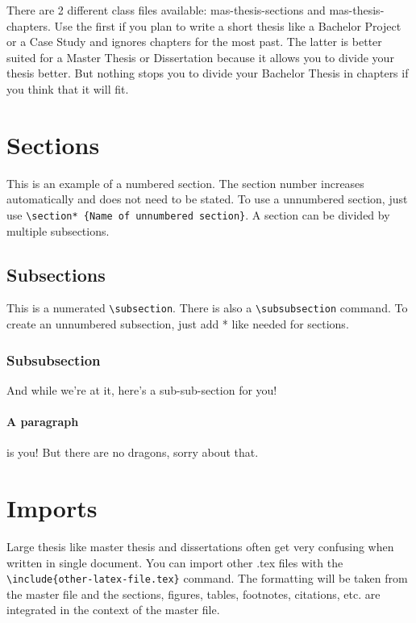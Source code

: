 \documentclass[masterarbeit,grey, english]{mas-thesis-sections}	%
\begin{document}
There are 2 different class files available: mas-thesis-sections and mas-thesis-chapters. Use the first if you plan to write a short thesis like a Bachelor Project or a Case Study and ignores chapters for the most past. The latter is better suited for a Master Thesis or Dissertation because it allows you to divide your thesis better. But nothing stops you to divide your Bachelor Thesis in chapters if you think that it will fit.

\newpage


\section{Sections}

This is an example of a numbered section. The section number increases automatically and does not need to be stated. To use a unnumbered section, just use \texttt{\textbackslash section* \{Name of unnumbered section\}}. A section can be divided by multiple subsections.

\subsection{Subsections}

This is a numerated \texttt{\textbackslash subsection}. There is also a \texttt{\textbackslash subsubsection} command. To create an unnumbered subsection, just add * like needed for sections.

\subsubsection{Subsubsection}

And while we're at it, here's a sub-sub-section for you!

\paragraph{A paragraph} is you! But there are no dragons, sorry about that.

\newpage

\section{Imports}

Large thesis like master thesis and dissertations often get very confusing when written in single document. You can import other .tex files with the\\\texttt{\textbackslash include\{other-latex-file.tex\}} command. The formatting will be taken from the master file and the sections, figures, tables, footnotes, citations, etc. are integrated in the context of the master file.
\end{document}
